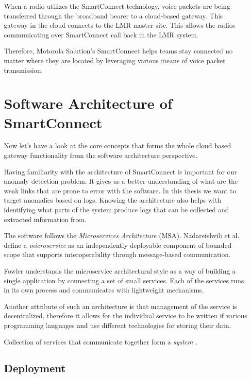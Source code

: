 When a radio utilizes the SmartConnect technology, voice packets are being transferred through the broadband bearer to a cloud-based gateway. This gateway in the cloud connects to the LMR master site. This allows the radios communicating over SmartConnect call back in the LMR system. 

Therefore, Motorola Solution's SmartConnect helps teams stay connected no matter where they are located by leveraging various means of voice packet transmission.

\section{Software Architecture of SmartConnect}
\label{smart-connect:architecture}

Now let's have a look at the core concepts that forms the whole cloud based gateway functionality from the software architecture perspective. 

Having familiarity with the architecture of SmartConnect is important for our anomaly detection problem. It gives us a better understanding of what are the weak links that are prone to error with the software. 
In this thesis we want to target anomalies based on logs. Knowing the architecture also helps with identifying what parts of the system produce logs that can be collected and extracted information from.

The software follows the \textit{Microservices Architecture} (MSA).
Nadareishvili et al. \cite{nadareishvili2016microservice} define a \textit{microservice} as an independently deployable component of bounded scope that supports interoperability through message-based communication. 

Fowler \cite{fowler2014microservices} understands the microservice architectural style as a way of building a single application by connecting a set of small services. Each of the services runs in its own process and communicates with lightweight mechanisms.

Another attribute of such an architecture is that management of the service is decentralized, therefore it allows for the individual service to be written if various programming languages and use different technologies for storing their data.

Collection of services that communicate together form a \textit{system} \cite{indrasiri2018microservices}.

\subsection{Deployment}

